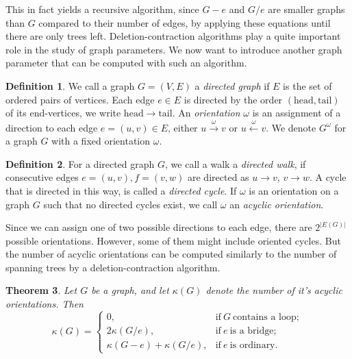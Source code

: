 \documentclass[12pt,a4paper, twoside, autooneside=false]{scrartcl}
\newtheorem{theorem}{Theorem}[section]
\theoremstyle{definition}
\newtheorem{definition}[theorem]{Definition}
\theoremstyle{remark}
\numberwithin{equation}{section}
\begin{document}
This in fact yields a recursive algorithm, since $G - e$ and $G / e$ are smaller graphs than $G$ compared to their number of edges, by applying these equations until there are only trees left. Deletion-contraction algorithms play a quite important role in the study of graph parameters. We now want to introduce another graph parameter that can be computed with such an algorithm.
\begin{definition}
We call a graph $G = (V,E)$ a \textit{directed graph} if $E$ is the set of ordered pairs of vertices. Each edge $e \in E$ is directed by the order $(\mathrm{head},\mathrm{tail})$ of its end-vertices, we write $\mathrm{head} \to \mathrm{tail}$.
 An \textit{orientation} $\omega$ is an assignment of a direction to each edge $e = (u,v) \in E$, either $ u \overset{\omega}{\to} v $ or $ u \overset{\omega}{\leftarrow} v$. We denote $G^\omega$ for a graph $G$ with a fixed orientation $\omega$.
\end{definition}
\begin{definition}
For a directed graph $G$, we call a walk a \textit{directed walk}, if consecutive edges $e = (u,v), f = (v, w)$ are directed as $u \to v$, $v \to w$. A cycle that is directed in this way, is called a \textit{directed cycle}. If $\omega$ is an orientation on a graph $G$ such that no directed cycles exist, we call $\omega$ an \textit{acyclic orientation}.
\end{definition}
Since we can assign one of two possible directions to each edge, there are $2^{|E(G)|}$ possible orientations. However, some of them might include oriented cycles. But the number of acyclic orientations can be computed similarly to the number of spanning trees by a deletion-contraction algorithm.
\begin{theorem}
Let $G$ be a graph, and let $\kappa(G)$ denote the number of it's acyclic orientations. Then 
\[
\kappa(G) = \begin{cases}
0, & \text{if} \ G \ \text{contains a loop}; \\
2 \kappa(G / e), & \text{if} \ e \ \text{is a bridge}; \\
\kappa(G - e) + \kappa(G / e), & \text{if} \ e \ \text{is ordinary}.
\end{cases}
\]
\end{theorem}
\end{document}
